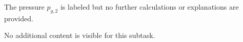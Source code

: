 The pressure \( p_{g,2} \) is labeled but no further calculations or explanations are provided.  

No additional content is visible for this subtask.